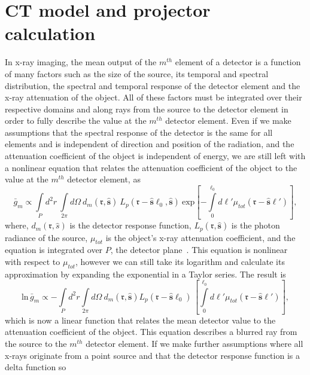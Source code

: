 \section{CT model and projector calculation}
In x-ray imaging, the mean output of the $m^{th}$ element of a detector is a function of many factors such as the size of the source, its temporal and spectral distribution, the spectral and temporal response of the detector element and the x-ray attenuation of the object.  All of these factors must be integrated over their respective domains and along rays from the source to the detector element in order to fully describe the value at the $m^{th}$ detector element.  Even if we make assumptions that the spectral response of the detector is the same for all elements and is independent of direction and position of the radiation, and the attenuation coefficient of the object is independent of energy, we are still left with a nonlinear equation that relates the attenuation coefficient of the object to the value at the $m^{th}$ detector element, as
%
\begin{equation}
\bar{g}_m \propto \int\limits_P d^2r \ \int\limits_{2 \pi} d \Omega \
	d_m(\mathbf{\mathfrak{r}}, \hat{\mathbf{s}}) \ L_p (\mathbf{\mathfrak{r}} - \hat{\mathbf{s}} \ell_0, \hat{\mathbf{s}}) \
	\mathrm{exp}\left[ -\int\limits_0^{\ell_0} d\ell' \mu_{tot}(\mathbf{\mathfrak{r}} - \hat{\mathbf{s}} \ell')\right],
\label{eq:xrayprop}
\end{equation}
%
where, $d_m(\mathbf{\mathfrak{r}}, \hat{s})$ is the detector response function, $L_p(\mathbf{\mathfrak{r}}, \hat{\mathbf{s}})$ is the photon radiance of the source, $\mu_{tot}$ is the object's x-ray attenuation coefficient, and the equation is integrated over $P$, the detector plane~\citep{Barrett2004}.  This equation is nonlinear with respect to $\mu_{tot}$, however we can still take its logarithm and calculate its approximation by expanding the exponential in a Taylor series.  The result is 
%
\begin{equation}
\mathrm{ln} \, \bar{g}_m \propto -\int\limits_P d^2r \int\limits_{2 \pi}
d \Omega \ d_m( \mathbf{\mathfrak{r}}, \hat{\mathbf{s}} )
L_p (\mathbf{\mathfrak{r}} - \hat{\mathbf{s}} \ell_0) \,
\left[ \int\limits_0^{\ell_0} d\ell' \mu_{tot}(\mathbf{\mathfrak{r}} - \hat{\mathbf{s}} \ell')\right],
\label{eq:xrayprop_approx1}
\end{equation}
%
which is now a linear function that relates the mean detector value to the attenuation coefficient of the object.  This equation describes a blurred ray from the source to the $m^{th}$ detector element.  If we make further assumptions where all x-rays originate from a point source and that the detector response function is a delta function so 
